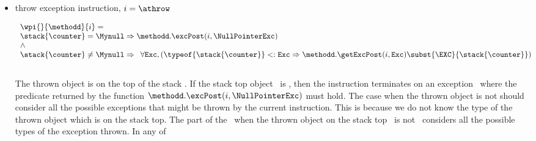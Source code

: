 \begin{itemize}
						
						
						
						
					
\item throw exception instruction, $ i =\athrow $
				
							$$ \begin{array}{l}
							          \wpi{} {\methodd}{i}  = \\
								    \stack{\counter} = \Mynull \Rightarrow  \methodd.\excPost( i, \NullPointerExc) \\
								     \wedge \\
							          \stack{\counter} \neq \Mynull \Rightarrow 
								    \begin{array}{l}  
								       \forall  \mbox{\rm\texttt{Exc}}, \left(
								        \typeof{\stack{\counter}} <: \mbox{\rm\texttt{Exc}}   \Rightarrow 
								         \methodd.\getExcPost( i, \mbox{\rm\texttt{Exc}}    )\subst{ \EXC }{\stack{\counter}  } \right)
								                     
								    \end{array} 
							   \end{array}
							$$ \\
						The thrown object is on the top of the stack \stack{\counter}.
						If the stack top object \stack{\counter} \ is \Mynull, then the instruction \athrow{}  terminates on an exception
						\NullPointerExc \ where the predicate returned by the function $ \methodd.\excPost( i, \NullPointerExc)$ must hold.
						The case when  the thrown object is not \Mynull{}  should consider all the possible exceptions that
						might be thrown by the current instruction. This is because we do not know the type of the thrown object which is
						on the stack top.
						The part of the \fwpi \ when the thrown object on the stack top  \stack{\counter} \ is not \Mynull \ considers all the possible types
						of the exception thrown. In any of 
						
						
	 		\end{itemize}


